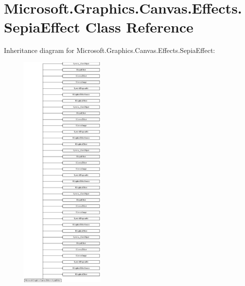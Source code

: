 \hypertarget{class_microsoft_1_1_graphics_1_1_canvas_1_1_effects_1_1_sepia_effect}{}\section{Microsoft.\+Graphics.\+Canvas.\+Effects.\+Sepia\+Effect Class Reference}
\label{class_microsoft_1_1_graphics_1_1_canvas_1_1_effects_1_1_sepia_effect}
Inheritance diagram for Microsoft.\+Graphics.\+Canvas.\+Effects.\+Sepia\+Effect\+:\begin{figure}[H]
\begin{center}
\leavevmode
\includegraphics[height=12.000000cm]{class_microsoft_1_1_graphics_1_1_canvas_1_1_effects_1_1_sepia_effect}
\end{center}
\end{figure}
